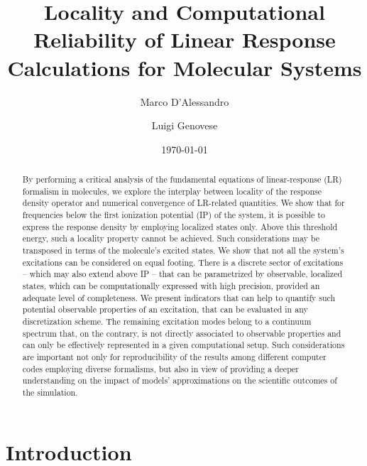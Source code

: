 \documentclass[reprint,aps,prb]{revtex4-1}
\begin{document}

\title{Locality and Computational Reliability of Linear Response Calculations for Molecular Systems}
\author{Marco D'Alessandro}
\author{Luigi Genovese}
\date{\today}

\begin{abstract}
By performing a critical analysis of the fundamental equations of linear-response (LR) formalism in molecules,
we explore the interplay between locality of the response density operator and  numerical convergence of LR-related quantities.
We show that for frequencies below the first ionization potential (IP) of the system, it is possible to express the response density by employing localized states only.
Above this threshold energy, such a locality property cannot be achieved.
Such considerations may be transposed in terms of the molecule's excited states. We show that not all the system's excitations can be considered on equal footing.
There is a discrete sector of excitations -- which may also extend above IP -- that can be parametrized by observable, localized states, which can be computationally expressed with high precision, provided an adequate level of completeness.
We present indicators that can help to quantify such potential observable properties of an excitation, that can be evaluated
in any discretization scheme.
The remaining excitation modes belong to a continuum spectrum that, on the contrary, is not directly associated to observable properties and can only be effectively represented in a given computational setup.
Such considerations are important not only for reproducibility of the results among different computer codes
employing diverse formalisms, but also in view of providing a deeper understanding on the impact of models'
approximations on the scientific outcomes of the simulation.
\end{abstract}

\maketitle

\section{Introduction}
\end{document}
